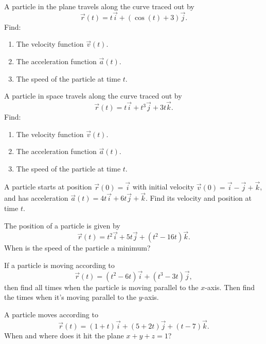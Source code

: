 \documentclass[12pt,reqno]{amsart}
\begin{document}
\bigskip
\prob A particle in the plane travels along the curve traced out by
	\[\vec{r}(t) = t\vec{i} + (\cos{(t)}+3)\vec{j}.
	\]
Find:

\medskip
\begin{enumerate}
\item The velocity function $\vec{v}(t)$.\vfill
\item The acceleration function $\vec{a}(t)$.\vfill
\item The speed of the particle at time $t$.
\end{enumerate}

\vfill
\prob A particle in space travels along the curve traced out by
	\[\vec{r}(t) = t\vec{i}+t^3\vec{j}+3t\vec{k}.
	\]
Find:

\medskip
\begin{enumerate}
\item The velocity function $\vec{v}(t)$.\vfill
\item The acceleration function $\vec{a}(t)$.\vfill
\item The speed of the particle at time $t$.
\end{enumerate}

\vfill
\newpage
\prob A particle starts at position $\vec{r}(0)=\vec{i}$ with initial velocity $\vec{v}(0) = \vec{i}-\vec{j}+\vec{k}$, and has acceleration $\vec{a}(t) = 4t\vec{i}+6t\vec{j}+\vec{k}$. Find its velocity and position at time $t$.

\vfill
\prob The position of a particle is given by
	\[\vec{r}(t) = t^2\vec{i}+5t\vec{j}+(t^2-16t)\vec{k}.
	\]
When is the speed of the particle a minimum?

\vfill
\prob If a particle is moving according to
	\[\vec{r}(t) = (t^2 - 6t)\vec{i}+ (t^3 - 3t)\vec{j},
	\]
then find all times when the particle is moving parallel to the $x$-axis. Then find the times when it's moving parallel to the $y$-axis.

\vfill
\prob A particle moves according to
	\[\vec{r}(t) = (1+t)\vec{i}+(5+2t)\vec{j}+(t-7)\vec{k}.
	\]
When and where does it hit the plane $x+y+z=1$?

\vfill
\end{document}
